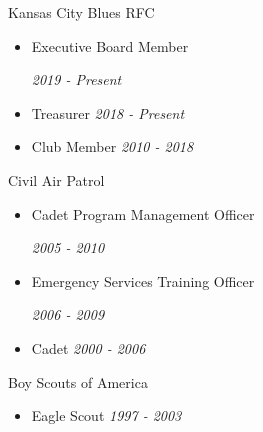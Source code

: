
\Affiliation
{Kansas City Blues RFC}
{\begin{itemize}
    \item Executive Board Member \newline \strut\hfill \emph{2019 - Present}
    \item Treasurer \hfill \emph{2018 - Present}
    \item Club Member \hfill \emph{2010 - 2018}
\end{itemize}}

\vspace*{0.1 in}

\Affiliation
{Civil Air Patrol}
{\begin{itemize}
    \item Cadet Program Management Officer \newline \strut\hfill \emph{2005 - 2010}
    \item Emergency Services Training Officer \newline \strut\hfill \emph{2006 - 2009}
    \item Cadet \hfill \emph{2000 - 2006}
\end{itemize}}

\vspace*{0.1 in}

\Affiliation
{Boy Scouts of America}
{\begin{itemize}
    \item Eagle Scout \hfill \emph{1997 - 2003}
\end{itemize}}